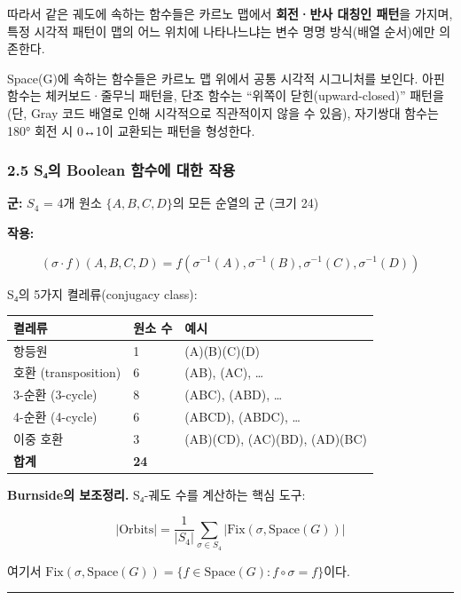 \documentclass[
]{article}
\newcounter{none} %
\begin{document}
따라서 같은 궤도에 속하는 함수들은 카르노 맵에서 \textbf{회전·반사
대칭인 패턴}을 가지며, 특정 시각적 패턴이 맵의 어느 위치에 나타나느냐는
변수 명명 방식(배열 순서)에만 의존한다.

Space(G)에 속하는 함수들은 카르노 맵 위에서 공통 시각적 시그니처를
보인다. 아핀 함수는 체커보드·줄무늬 패턴을, 단조 함수는 ``위쪽이
닫힌(upward-closed)'' 패턴을(단, Gray 코드 배열로 인해 시각적으로
직관적이지 않을 수 있음), 자기쌍대 함수는 180° 회전 시 0↔1이 교환되는
패턴을 형성한다.

\subsubsection{2.5 S₄의 Boolean 함수에 대한
작용}\label{sux2084uxc758-boolean-uxd568uxc218uxc5d0-uxb300uxd55c-uxc791uxc6a9}

\textbf{군:} \(S_4\) = 4개 원소 \(\{A, B, C, D\}\)의 모든 순열의 군
(크기 24)

\textbf{작용:}

\[(\sigma \cdot f)(A, B, C, D) = f(\sigma^{-1}(A), \sigma^{-1}(B), \sigma^{-1}(C), \sigma^{-1}(D))\]

S₄의 5가지 켤레류(conjugacy class):

{\def\LTcaptype{none} %
\begin{longtable}[]{@{}lll@{}}
\toprule\noalign{}
켤레류 & 원소 수 & 예시 \\
\midrule\noalign{}
\endhead
\bottomrule\noalign{}
\endlastfoot
항등원 & 1 & (A)(B)(C)(D) \\
호환 (transposition) & 6 & (AB), (AC), \ldots{} \\
3-순환 (3-cycle) & 8 & (ABC), (ABD), \ldots{} \\
4-순환 (4-cycle) & 6 & (ABCD), (ABDC), \ldots{} \\
이중 호환 & 3 & (AB)(CD), (AC)(BD), (AD)(BC) \\
\textbf{합계} & \textbf{24} & \\
\end{longtable}
}

\textbf{Burnside의 보조정리.} S₄-궤도 수를 계산하는 핵심 도구:

\[|\text{Orbits}| = \frac{1}{|S_4|} \sum_{\sigma \in S_4} |\text{Fix}(\sigma, \text{Space}(G))|\]

여기서
\(\text{Fix}(\sigma, \text{Space}(G)) = \{ f \in \text{Space}(G) : f \circ \sigma = f \}\)이다.

\begin{center}\rule{0.5\linewidth}{0.5pt}\end{center}
\end{document}

